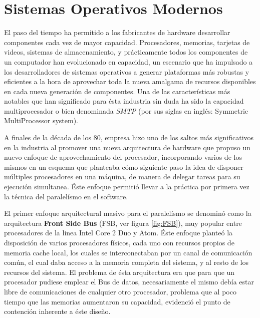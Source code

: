 \section{Sistemas Operativos Modernos}
El paso del tiempo ha permitido a los fabricantes de hardware desarrollar componentes cada vez de mayor capacidad. Procesadores, memorias, tarjetas de videos, sistemas de almacenamiento, y prácticamente todos los componentes de un computador han evolucionado en capacidad, un escenario que ha impulsado a los desarrolladores de sistemas operativos a generar plataformas más robustas y eficientes a la hora de aprovechar toda la nueva amalgama de recursos disponibles en cada nueva generación de componentes. Una de las características más notables que han significado para ésta industria sin duda ha sido la capacidad multiprocesador o bien denominada \emph{SMTP} (por sus siglas en inglés: Symmetric MultiProcessor system).

A finales de la década de los 80, {empresa} hizo uno de los saltos más significativos en la industria al promover una nueva arquitectura de hardware que propuso un nuevo enfoque de aprovechamiento del procesador, incorporando varios de los mismos en un esquema que planteaba cómo siguiente paso la idea de disponer múltiples procesadores en una máquina, de manera de delegar tareas para su ejecución simultanea. Éste enfoque permitió llevar a la práctica por primera vez la técnica del paralelísmo en el software.

El primer enfoque arquitectural masivo para el paralelísmo se denominó como la arquitectura \textbf{Front Side Bus} (FSB, ver figura \ref{fig:FSB}), muy popular entre procesadores de la linea Intel Core 2 Duo y Atom. Éste enfoque planteó la disposición de varios procesadores físicos, cada uno con recursos propios de memoria cache local, los cuales se interconectaban por un canal de comunicación común, el cual daba acceso a la memoria completa del sistema, y al resto de los recursos del sistema. El problema de ésta arquitectura era que para que un procesador pudiese emplear el Bus de datos, necesariamente el mismo debía estar libre de comunicaciones de cualquier otro procesador, problema que al poco tiempo que las memorias aumentaron su capacidad, evidenció el punto de contención inherente a éste diseño.

